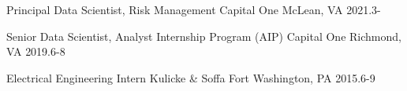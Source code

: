 

\begin{cvhonors}

    \cvhonor
    {Principal Data Scientist, Risk Management} %
    {Capital One} %
    {McLean, VA} %
    {2021.3-} %

    \cvhonor
    {Senior Data Scientist, Analyst Internship Program (AIP)} %
    {Capital One} %
    {Richmond, VA} %
    {2019.6-8} %

    \cvhonor
    {Electrical Engineering Intern} %
    {Kulicke \& Soffa} %
    {Fort Washington, PA} %
    {2015.6-9} %
  
\end{cvhonors}
